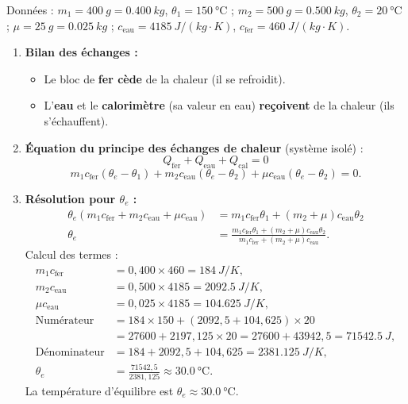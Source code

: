 \documentclass[11pt]{article}
\begin{document}
\begin{corrige}
Données : $m_1 = \SI{400}{g} = \SI{0,400}{kg}$, $\theta_1 = \SI{150}{\degreeCelsius}$ ; $m_2 = \SI{500}{g} = \SI{0,500}{kg}$, $\theta_2 = \SI{20}{\degreeCelsius}$ ; $\mu = \SI{25}{g} = \SI{0,025}{kg}$ ; $c_{\text{eau}} = \SI{4185}{J/(kg\cdot K)}$, $c_{\text{fer}} = \SI{460}{J/(kg\cdot K)}$.
\begin{enumerate}
\item \textbf{Bilan des échanges :}
  \begin{itemize}
  \item Le bloc de \textbf{fer cède} de la chaleur (il se refroidit).
  \item L'\textbf{eau} et le \textbf{calorimètre} (sa valeur en eau) \textbf{reçoivent} de la chaleur (ils s'échauffent).
  \end{itemize}
\item \textbf{Équation du principe des échanges de chaleur} (système isolé) :
  \[
  Q_{\text{fer}} + Q_{\text{eau}} + Q_{\text{cal}} = 0
  \]
  \[
  m_1 c_{\text{fer}} (\theta_e - \theta_1) + m_2 c_{\text{eau}} (\theta_e - \theta_2) + \mu c_{\text{eau}} (\theta_e - \theta_2) = 0.
  \]
\item \textbf{Résolution pour $\theta_e$ :}
  \begin{align*}
  \theta_e (m_1 c_{\text{fer}} + m_2 c_{\text{eau}} + \mu c_{\text{eau}}) &= m_1 c_{\text{fer}} \theta_1 + (m_2 + \mu) c_{\text{eau}} \theta_2 \\
  \theta_e &= \frac{m_1 c_{\text{fer}} \theta_1 + (m_2 + \mu) c_{\text{eau}} \theta_2}{m_1 c_{\text{fer}} + (m_2 + \mu) c_{\text{eau}}}.
  \end{align*}
  Calcul des termes :
  \begin{align*}
  m_1 c_{\text{fer}} &= 0,400 \times 460 = \SI{184}{J/K}, \\
  m_2 c_{\text{eau}} &= 0,500 \times 4185 = \SI{2092,5}{J/K}, \\
  \mu c_{\text{eau}} &= 0,025 \times 4185 = \SI{104,625}{J/K}, \\
  \text{Numérateur} &= 184 \times 150 + (2092,5 + 104,625) \times 20 \\
  &= 27600 + 2197,125 \times 20 = 27600 + 43942,5 = \SI{71542,5}{J}, \\
  \text{Dénominateur} &= 184 + 2092,5 + 104,625 = \SI{2381,125}{J/K}, \\
  \theta_e &= \frac{71542,5}{2381,125} \approx \SI{30,0}{\degreeCelsius}.
  \end{align*}
  La température d'équilibre est \textbf{$\theta_e \approx \SI{30,0}{\degreeCelsius}$}.
\end{enumerate}
\end{corrige}
\end{document}
